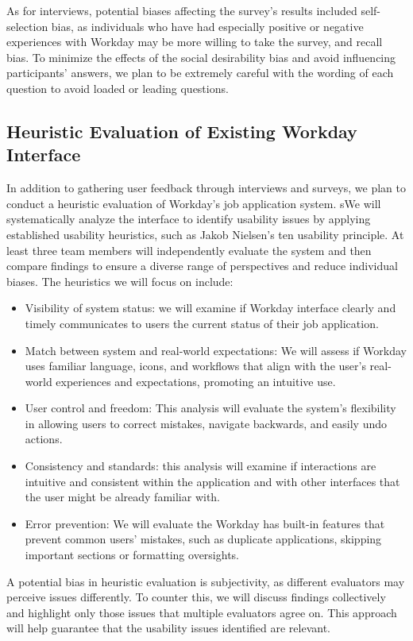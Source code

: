 \documentclass[
	letterpaper, %
]{jdf}
\begin{document}
\begin{sloppypar}
As for interviews, potential biases affecting  the survey’s results  included self-selection bias, as individuals who have had especially positive or negative experiences with Workday may be more willing to take the survey, and recall bias. To  minimize the effects of the social desirability bias and avoid influencing participants’ answers, we plan to be extremely careful with the wording of each question to avoid loaded or leading questions. 
\hfill \break

\subsection{Heuristic Evaluation of Existing Workday Interface}
In addition to gathering user feedback through interviews and surveys, we plan to conduct a heuristic evaluation of Workday’s job application system. sWe will systematically analyze the interface to identify usability issues by applying established usability heuristics, such as Jakob Nielsen’s ten usability principle. At least three team members will independently evaluate the system and then compare findings to ensure a diverse range of perspectives and reduce individual biases. The heuristics we will focus on include:
\begin{itemize}
    \item Visibility of system status: we will examine if Workday interface clearly and timely communicates to users the current status of their job application.
    \item Match between system and real-world expectations: We will assess if  Workday uses familiar language, icons, and workflows that align with the user’s real-world experiences and expectations, promoting an intuitive use.
    \item User control and freedom: This analysis will evaluate the system’s flexibility in allowing users to correct mistakes, navigate backwards, and easily undo actions. 
    \item Consistency and standards:  this analysis will examine if  interactions are intuitive and consistent within the application and with other interfaces that the user might be already familiar with.
    \item Error prevention: We will evaluate the Workday has built-in features that prevent common users’ mistakes, such as duplicate applications, skipping important sections or formatting oversights.
\end{itemize}
A potential bias in heuristic evaluation is subjectivity, as different evaluators may perceive issues differently. To counter this, we will discuss findings collectively and highlight only those issues that multiple evaluators agree on. This approach will help guarantee that the usability issues identified are relevant.	
\hfill \break


\end{sloppypar}
\end{document}
